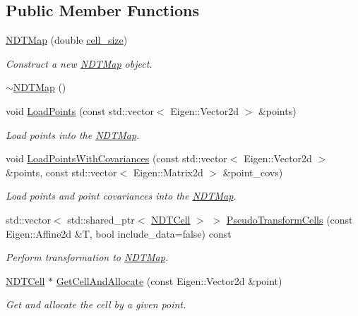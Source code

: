 \subsection*{Public Member Functions}
\begin{DoxyCompactItemize}
\item 
\hyperlink{classNDTMap_aec578016c17abfe085d0d4cf1dca1828}{N\+D\+T\+Map} (double \hyperlink{testl__match_8cc_a456553c1fc05d94c07e74c5fd45f6621}{cell\+\_\+size})
\begin{DoxyCompactList}\small\item\em Construct a new \hyperlink{classNDTMap}{N\+D\+T\+Map} object. \end{DoxyCompactList}\item 
\hyperlink{classNDTMap_af6e42f0f13a33e6027e14635631e1312}{$\sim$\+N\+D\+T\+Map} ()
\item 
void \hyperlink{classNDTMap_ab22791d0b328ae9639799bc5d31d8b49}{Load\+Points} (const std\+::vector$<$ Eigen\+::\+Vector2d $>$ \&points)
\begin{DoxyCompactList}\small\item\em Load points into the \hyperlink{classNDTMap}{N\+D\+T\+Map}. \end{DoxyCompactList}\item 
void \hyperlink{classNDTMap_a00f9fe19e50c264cb4cf1de68f0c05e3}{Load\+Points\+With\+Covariances} (const std\+::vector$<$ Eigen\+::\+Vector2d $>$ \&points, const std\+::vector$<$ Eigen\+::\+Matrix2d $>$ \&point\+\_\+covs)
\begin{DoxyCompactList}\small\item\em Load points and point covariances into the \hyperlink{classNDTMap}{N\+D\+T\+Map}. \end{DoxyCompactList}\item 
std\+::vector$<$ std\+::shared\+\_\+ptr$<$ \hyperlink{classNDTCell}{N\+D\+T\+Cell} $>$ $>$ \hyperlink{classNDTMap_a3d16c1f716de28d6c5a6572346c45ee6}{Pseudo\+Transform\+Cells} (const Eigen\+::\+Affine2d \&T, bool include\+\_\+data=false) const
\begin{DoxyCompactList}\small\item\em Perform transformation to \hyperlink{classNDTMap}{N\+D\+T\+Map}. \end{DoxyCompactList}\item 
\hyperlink{classNDTCell}{N\+D\+T\+Cell} $\ast$ \hyperlink{classNDTMap_ab37c2e140bf7b138be3cd0b4d5104dfc}{Get\+Cell\+And\+Allocate} (const Eigen\+::\+Vector2d \&point)
\begin{DoxyCompactList}\small\item\em Get and allocate the cell by a given point. \end{DoxyCompactList}\item 

\end{DoxyCompactItemize}
